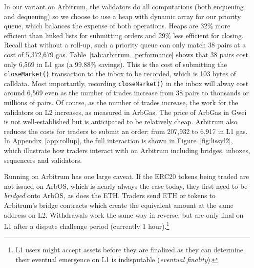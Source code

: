 In our \cm variant on Arbitrum, the validators do all computations (both enqueuing and dequeuing) so we choose to use a heap with dynamic array for our priority queue, which balances the expense of both operations. Heaps are 32\% more efficient than linked lists for submitting orders and 29\% less efficient for closing. Recall that without a roll-up, such a priority queue can only match 38 pairs at a cost of 5,372,679 gas. Table~\ref{tab:arbitrum_performance} shows that 38 pairs cost only 6,569 in L1 gas (a 99.88\% savings). This is the cost of submitting the \texttt{closeMarket()} transaction to the inbox to be recorded, which is 103 bytes of calldata. Most importantly, recording \texttt{closeMarket()} in the inbox will alway cost around 6,569 even as the number of trades increase from 38 pairs to thousands or millions of pairs. Of course, as the number of trades increase, the work for the validators on L2 increases, as measured in ArbGas. The price of ArbGas in Gwei is not well-established but is anticipated to be relatively cheap.  Arbitrum also reduces the costs for traders to submit an order: from 207,932 to 6,917 in L1 gas. In Appendix~\ref{app:rollup}, the full interaction is shown in Figure~\ref{fig:lissyl2}, which illustrate how traders interact with \cm on Arbitrum including bridges, inboxes, sequencers and validators.

Running \cm on Arbitrum has one large caveat. If the ERC20 tokens being traded are not issued on ArbOS, which is nearly always the case today, they first need to be \textit{bridged} onto ArbOS, as does the ETH. Traders send ETH or tokens to Arbitrum's bridge contracts which create the equivalent amount at the same address on L2. Withdrawals work the same way in reverse, but are only final on L1 after a dispute challenge period (currently 1 hour).\footnote{L1 users might accept assets before they are finalized as they can determine their eventual emergence on L1 is indisputable (\textit{eventual finality}).} 



